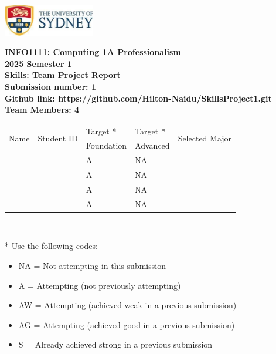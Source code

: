 \documentclass[a4paper, 11pt]{report}
\begin{document}
\begin{titlepage}
\begin{flushright}
\includegraphics[width=4cm]{USyd}\\[1cm]
\end{flushright}

\begin{centering}
\textbf{\huge INFO1111: Computing 1A Professionalism}\\[0.75cm]
\textbf{\huge 2025 Semester 1}\\[2cm]
\textbf{\huge Skills: Team Project Report}\\[2cm]

\textbf{\large Submission number: 1}\\[0.5cm]
\textbf{\large Github link: https://github.com/Hilton-Naidu/SkillsProject1.git }\\[0.75cm]
\textbf{\huge Team Members: 4}\\[0.75cm]

\begin{tabular}{|p{}|p{}|p{}|p{}|p{}|}
	\hline
	\multirow{2}{*}{Name} & \multirow{2}{*}{Student ID} & Target * & Target * & \multirow{2}{*}{Selected Major} \\
	 & & Foundation & Advanced & \\
	\hline
	\hline
	\raggedright{\studA} & \sidA & A & NA & \majA \\
	\hline
	\raggedright{\studB} & \sidB & A & NA & \majB \\
	\hline
	\raggedright{\studC} & \sidC & A & NA & \majC \\
	\hline
	\raggedright{\studD} & \sidD & A & NA & \majD \\
	\hline
\end{tabular}
\\[0.5cm]
\end{centering}

* Use the following codes:
\begin{itemize}
\setlength\itemsep{0em}
\item NA = Not attempting in this submission
\item A = Attempting (not previously attempting)
\item AW = Attempting (achieved weak in a previous submission) 
\item AG = Attempting (achieved good in a previous submission)
\item S = Already achieved strong in a previous submission
\end{itemize}

\thispagestyle{empty}
\end{titlepage}
\end{document}
